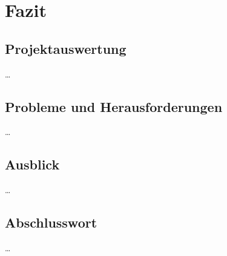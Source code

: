 
\chapter{Fazit} \label{Fazit}

\section{Projektauswertung} \label{Projektauswertung}

\ldots

\section{Probleme und Herausforderungen} \label{Probleme und Herausforderungen}

\ldots

\section{Ausblick} \label{Ausblick}

\ldots

\section{Abschlusswort} \label{Abschlusswort}

\ldots

